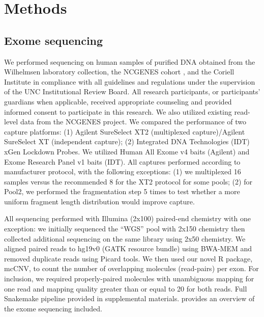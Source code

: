 \documentclass{bmcart}\usepackage[]{graphicx}\usepackage[]{color}
\begin{document}

\section{Methods}

\subsection{Exome sequencing}

We performed sequencing on human samples of purified DNA obtained from the Wilhelmsen laboratory collection, the NCGENES cohort \cite{foreman:2013aa}, and the Coriell Institute in compliance with all guidelines and regulations under the supervision of the UNC Institutional Review Board.
All research participants, or participants' guardians when applicable, received appropriate counseling and provided informed consent to participate in this research.
We also utilized existing read-level data from the NCGENES \cite{foreman:2013aa} project.
We compared the performance of two capture platforms: (1) Agilent SureSelect XT2 (multiplexed capture)/Agilent SureSelect XT (independent capture); (2) Integrated DNA Technologies (IDT) xGen Lockdown Probes.
We utilized Human All Exome v4 baits (Agilent) and Exome Research Panel v1 baits (IDT).
All captures performed according to manufacturer protocol, with the following exceptions: (1) we multiplexed 16 samples versus the recommended 8 for the XT2 protocol for some pools; (2) for Pool2, we performed the fragmentation step 5 times to test whether a more uniform fragment length distribution would improve capture.

All sequencing performed with Illumina (2x100) paired-end chemistry with one exception: we initially sequenced the ``WGS'' pool with 2x150 chemistry then collected additional sequencing on the same library using 2x50 chemistry.
We aligned paired reads to hg19v0 (GATK resource bundle) using BWA-MEM \cite{li:2013ab} and removed duplicate reads using Picard tools.
We then used our novel R package, mcCNV, to count the number of overlapping molecules (read-pairs) per exon.
For inclusion, we required properly-paired molecules with unambiguous mapping for one read and mapping quality greater than or equal to 20 for both reads.
Full Snakemake \cite{koster:2012aa} pipeline provided in supplemental materials.
 provides an overview of the exome sequencing included.
\end{document}
